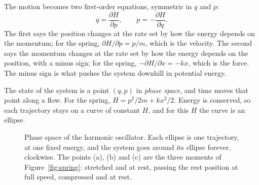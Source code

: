 The motion becomes two first-order equations, symmetric in $q$ and $p$:
\[
  \dot q = \frac{\partial H}{\partial p}, \qquad
  \dot p = -\frac{\partial H}{\partial q}.
\]
The first says the position changes at the rate set by how the energy depends on the
momentum; for the spring, $\partial H/\partial p = p/m$, which is the velocity. The
second says the momentum changes at the rate set by how the energy depends on the
position, with a minus sign; for the spring, $-\partial H/\partial x = -kx$, which is
the force. The minus sign is what pushes the system downhill in potential energy.

The state of the system is a point $(q, p)$ in \emph{phase space}, and time moves
that point along a flow. For the spring, $H = p^2/2m + kx^2/2$. Energy is
conserved, so each trajectory stays on a curve of constant $H$, and for this $H$ the
curve is an ellipse.

\begin{figure}[htbp]
\centering
{}
\caption{Phase space of the harmonic oscillator. Each ellipse is one trajectory,
at one fixed energy, and the system goes around its ellipse forever, clockwise. The
points (a), (b) and (c) are the three moments of Figure~\ref{fig:spring}: stretched
and at rest, passing the rest position at full speed, compressed and at
rest.}\label{fig:phase}
\end{figure}

